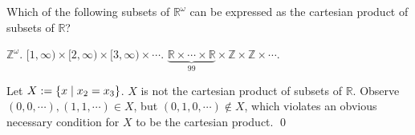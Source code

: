 \documentclass[a4paper,12pt]{article}
\begin{document}
\begin{exe}
	Which of the following subsets of \( \mathbb{R}^{\omega} \)
	can be expressed as the cartesian product of subsets of \( \mathbb{R} \)?
\end{exe}\begin{sol}\leavevmode \par
	\( \mathbb{Z}^{\omega} \).
	\( [1,\infty) \times [2,\infty) \times [3,\infty)\times \cdots \).
	\(
	\underbrace{\mathbb{R}\times \cdots \times \mathbb{R}}_{99}
	\times \mathbb{Z} \times \mathbb{Z} \times \cdots
	\).
	
	Let \( X:=\left\{ x \;|\; x_2=x_3 \right\} \).
	\( X \) is not the cartesian product of subsets of \( \mathbb{R} \).
	Observe
	\( (0,0,\cdots),(1,1,\cdots) \in X \),
	but
	\( (0,1,0,\cdots) \notin X \),
	which violates an obvious necessary condition for \( X \) to be the cartesian product.
	\qed\end{sol}
\end{document}
